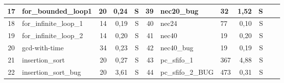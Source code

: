\begin{table*}[b!]
\begin{center}
{\begin{tabular}{|c|l|r|r|r||r|l|l|r|r|r|c|}
\hline
17	&for\_bounded\_loop1	&20	&0,24		&S		&39	&nec20\_bug		&32	&1,52		&S		\\
\hline
18	&for\_infinite\_loop\_1	&14	&0,19		&S		&40	&nec24			&77	&0,10		&S		\\
\hline
19	&for\_infinite\_loop\_2	&14	&0,20		&S		&41	&nec40			&19	&0,20		&S		\\
\hline
20	&gcd-with-time		&34	&0,23		&S		&42	&nec40\_bug		&19	&0,19		&S		\\
\hline
21	&insertion\_sort	&20	&0,27		&S		&43	&pc\_sfifo\_1		&367	&4,88		&S		\\
\hline
22	&insertion\_sort\_bug	&20	&3,61		&S		&44	&pc\_sfifo\_2\_BUG	&473	&0,31		&S		\\
\hline
\end{tabular} }
\end{center}
\label{table:results-of-the-ESBMC-k-induction}
\end{table*}


